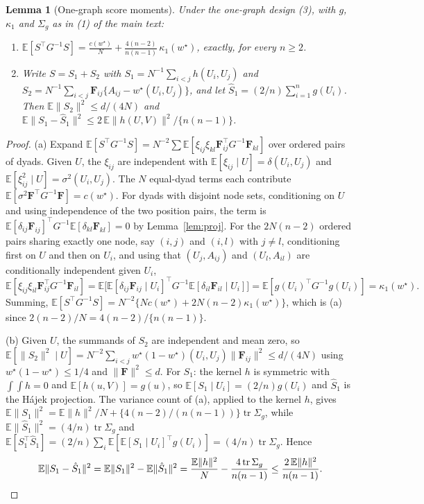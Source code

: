 \documentclass[10pt,a4paper]{amsart}
\newtheorem{lemma}{Lemma}
\newcommand{\E}{\mathbb{E}}
\newcommand{\Fv}{\mathbf{F}}
\newcommand{\norm}[1]{\|#1\|}
\newcommand{\tr}{\operatorname{tr}}
\newcommand{\wstar}{w^{\star}}
\begin{document}
\begin{lemma}[One-graph score moments]
\label{lem:onegraphscore}
Under the one-graph design (3), with $g$, $\kappa_1$ and $\Sigma_g$ as in (1) of the main text:
\begin{enumerate}
\item[(a)] $\displaystyle\E[S^{\top}G^{-1}S]=\frac{c(\wstar)}{N}+\frac{4(n-2)}{n(n-1)}\,\kappa_1(\wstar)$, exactly, for every $n\ge2$.
\item[(b)] Write $S=S_1+S_2$ with $S_1=N^{-1}\sum_{i<j}h(U_i,U_j)$ and $S_2=N^{-1}\sum_{i<j}\Fv_{ij}\{A_{ij}-\wstar(U_i,U_j)\}$, and let $\hat S_1=(2/n)\sum_{i=1}^{n}g(U_i)$. Then $\E\norm{S_2}^2\le d/(4N)$ and $\E\norm{S_1-\hat S_1}^2\le2\,\E\norm{h(U,V)}^2/\{n(n-1)\}$.
\end{enumerate}
\end{lemma}

\begin{proof}
(a) Expand $\E[S^{\top}G^{-1}S]=N^{-2}\sum\E[\xi_{ij}\xi_{kl}\Fv_{ij}^{\top}G^{-1}\Fv_{kl}]$ over ordered pairs of dyads. Given $U$, the $\xi_{ij}$ are independent with $\E[\xi_{ij}\mid U]=\delta(U_i,U_j)$ and $\E[\xi_{ij}^2\mid U]=\sigma^2(U_i,U_j)$. The $N$ equal-dyad terms each contribute $\E[\sigma^2\Fv^{\top}G^{-1}\Fv]=c(\wstar)$. For dyads with disjoint node sets, conditioning on $U$ and using independence of the two position pairs, the term is $\E[\delta_{ij}\Fv_{ij}]^{\top}G^{-1}\E[\delta_{kl}\Fv_{kl}]=0$ by Lemma~\ref{lem:proj}. For the $2N(n-2)$ ordered pairs sharing exactly one node, say $(i,j)$ and $(i,l)$ with $j\neq l$, conditioning first on $U$ and then on $U_i$, and using that $(U_j,A_{ij})$ and $(U_l,A_{il})$ are conditionally independent given $U_i$,
\[
\E[\xi_{ij}\xi_{il}\Fv_{ij}^{\top}G^{-1}\Fv_{il}]=\E\big[\E[\delta_{ij}\Fv_{ij}\mid U_i]^{\top}G^{-1}\E[\delta_{il}\Fv_{il}\mid U_i]\big]=\E[g(U_i)^{\top}G^{-1}g(U_i)]=\kappa_1(\wstar).
\]
Summing, $\E[S^{\top}G^{-1}S]=N^{-2}\{Nc(\wstar)+2N(n-2)\kappa_1(\wstar)\}$, which is (a) since $2(n-2)/N=4(n-2)/\{n(n-1)\}$.

(b) Given $U$, the summands of $S_2$ are independent and mean zero, so $\E[\norm{S_2}^2\mid U]=N^{-2}\sum_{i<j}\wstar(1-\wstar)(U_i,U_j)\norm{\Fv_{ij}}^2\le d/(4N)$ using $\wstar(1-\wstar)\le1/4$ and $\norm{\Fv}^2\le d$. For $S_1$: the kernel $h$ is symmetric with $\int\!\!\int h=0$ and $\E[h(u,V)]=g(u)$, so $\E[S_1\mid U_i]=(2/n)g(U_i)$ and $\hat S_1$ is the H\'ajek projection. The variance count of (a), applied to the kernel $h$, gives $\E\norm{S_1}^2=\E\norm{h}^2/N+\{4(n-2)/(n(n-1))\}\tr\Sigma_g$, while $\E\norm{\hat S_1}^2=(4/n)\tr\Sigma_g$ and $\E[S_1^{\top}\hat S_1]=(2/n)\sum_i\E[\E[S_1\mid U_i]^{\top}g(U_i)]=(4/n)\tr\Sigma_g$. Hence
\[
\E\norm{S_1-\hat S_1}^2=\E\norm{S_1}^2-\E\norm{\hat S_1}^2=\frac{\E\norm{h}^2}{N}-\frac{4\tr\Sigma_g}{n(n-1)}\le\frac{2\,\E\norm{h}^2}{n(n-1)}. \qedhere
\]
\end{proof}
\end{document}
